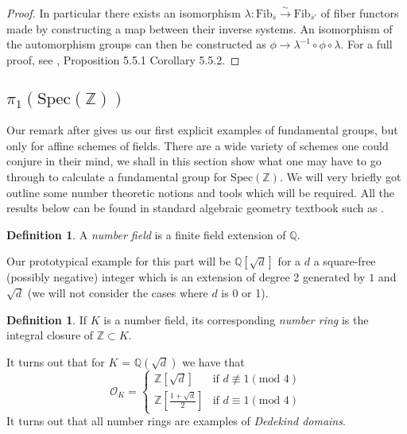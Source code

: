 \documentclass{article}
\theoremstyle{definition}
\newtheorem{definition}[theorem]{Definition}
\theoremstyle{remark}
\theoremstyle{plain}
\newcommand{\Z}{\mathbb{Z}}
\newcommand{\Q}{\mathbb{Q}}
\newcommand{\mc}[1]{\mathcal{#1}}
\begin{document}
\begin{proof}
	In particular there exists an isomorphism $\lambda: \text{Fib}_{\overline{s}} \xrightarrow{\sim} \text{Fib}_{\overline{s}'}$ of fiber functors made by constructing a map between their inverse systems.
	An isomorphism of the automorphism groups can then be constructed as $\phi \to \lambda^{-1} \circ \phi \circ \lambda$.
	For a full proof, see \cite{Szamuely}, Proposition 5.5.1 Corollary 5.5.2.
\end{proof}

\subsection{$\pi_1(\text{Spec}(\Z))$}

Our remark after  gives us our first explicit examples of fundamental groups, but only for affine schemes of fields.
There are a wide variety of schemes one could conjure in their mind, we shall in this section show what one may have to go through to calculate a fundamental group for $\text{Spec}(\Z)$.
We will very briefly got outline some number theoretic notions and tools which will be required.
All the results below can be found in standard algebraic geometry textbook such as \cite{langnumbertheory}.

\begin{definition}
	A \textit{number field} is a finite field extension of $\Q$.
\end{definition}

Our prototypical example for this part will be $\Q[\sqrt{d}]$ for a $d$ a square-free (possibly negative) integer which is an extension of degree 2 generated by $1$ and $\sqrt{d}$ (we will not consider the cases where $d$ is 0 or 1).

\begin{definition}
	If $K$ is a number field, its corresponding \textit{number ring} is the integral closure of $\Z \subset K$.
\end{definition}

It turns out that for $K$ = $\Q(\sqrt{d})$ we have that 
\[
	\mc{O}_K =
\left\{
	\begin{array}{ll}
	\Z[\sqrt{d}]  & \mbox{if } d \not\equiv 1 (\text{mod } 4) \\
	\Z[ \frac{1+\sqrt{d}}{2}] & \mbox{if } d \equiv 1 (\text{mod } 4)
	\end{array}
\right.\]
It turns out that all number rings are examples of \textit{Dedekind domains}.
\end{document}
